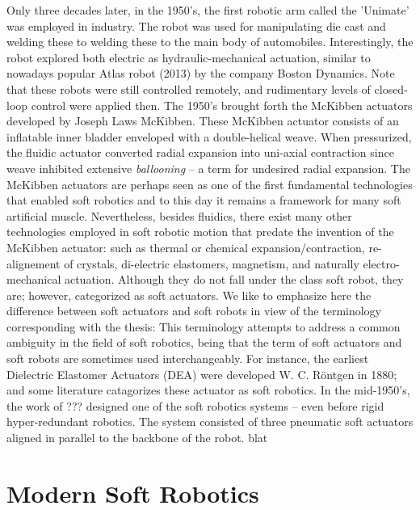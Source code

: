 Only three decades later, in the 1950's, the first robotic arm called the 'Unimate' was employed in industry. The robot was used for manipulating die cast and welding these to welding these to the main body of automobiles. Interestingly, the robot explored both electric as hydraulic-mechanical actuation, similar to nowadays popular Atlas robot (2013) by the company Boston Dynamics. Note that these robots were still controlled remotely, and rudimentary levels of closed-loop control were applied then. The 1950's brought forth the McKibben actuators developed by Joseph Laws McKibben. These McKibben actuator consists of an inflatable inner bladder enveloped with a double-helical weave. When pressurized, the fluidic actuator converted radial expansion into uni-axial contraction since weave inhibited extensive \emph{ballooning} -- a term for undesired radial expansion. The McKibben actuators are perhaps seen as one of the first fundamental technologies that enabled soft robotics and to this day it remains a framework for many soft artificial muscle. Nevertheless, besides fluidics, there exist many other technologies employed in soft robotic motion that predate the invention of the McKibben actuator: such as thermal or chemical expansion/contraction, re-alignement of crystals, di-electric elastomers, magnetism, and naturally electro-mechanical actuation. Although they do not fall under the class soft robot, they are; however, categorized as soft actuators. We like to emphasize here the difference between soft actuators and soft robots in view of the terminology corresponding with the thesis:
%
%
This terminology attempts to address a common ambiguity in the field of soft robotics, being that the term of soft actuators and soft robots are sometimes used interchangeably. For instance, the earliest Dielectric Elastomer Actuators (DEA) were developed W. C. R\"{o}ntgen in 1880; and some literature catagorizes these actuator as soft robotics.  In the mid-1950's, the work of ??? designed one of the soft robotics systems -- even before rigid hyper-redundant robotics. The system consisted of three pneumatic soft actuators aligned in parallel to the backbone of the robot. blat

\section{Modern Soft Robotics}


